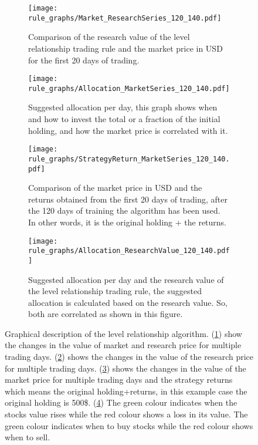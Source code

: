 \documentclass{article}%
\begin{document}
\begin{figure}[h]
\begin{subfigure}{0.48\textwidth}
\texttt{[image: rule\_graphs/Market\_ResearchSeries\_120\_140.pdf]} 
\caption{Comparison of the research value of the level relationship trading rule and the market price in USD for the first 20 days of trading.}
\label{fig:01}
\end{subfigure}	\quad
\begin{subfigure}{0.48\textwidth}
\texttt{[image: rule\_graphs/Allocation\_MarketSeries\_120\_140.pdf]}
\caption{Suggested allocation per day, this graph shows when and how to invest the total or a fraction of the initial holding, and how the market price is correlated with it.}
\label{fig:02}
\end{subfigure}


\begin{subfigure}{0.48\textwidth}
\texttt{[image: rule\_graphs/StrategyReturn\_MarketSeries\_120\_140.pdf]} 
\caption{Comparison of the market price in USD and the returns obtained from the first 20 days of trading, after the 120 days of training the algorithm has been used. In other words, it is the original holding + the returns.}
\label{fig:03}
\end{subfigure}
\quad
\begin{subfigure}{0.48\textwidth}
\texttt{[image: rule\_graphs/Allocation\_ResearchValue\_120\_140.pdf]}
\caption{Suggested allocation per day and the research value of the level relationship trading rule, the suggested allocation is calculated based on the research value. So, both are correlated as shown in this figure. }
\label{fig:04}
\end{subfigure}
\caption{Graphical description of the level relationship algorithm. (\ref{fig:01}) show the changes in the value of market and research price for multiple trading days.  (\ref{fig:02}) shows the changes in the value of the research price for multiple trading days. (\ref{fig:03}) shows the changes in the value of the market price for multiple trading days and the strategy returns which means the original holding+returns, in this example case the original holding is 500\$. (\ref{fig:04}) The green colour indicates when the stocks value rises while the red colour shows a loss in its value. The green colour indicates when to buy stocks while the red colour shows when to sell.}
\label{fig:image2}
\end{figure}
\end{document}
